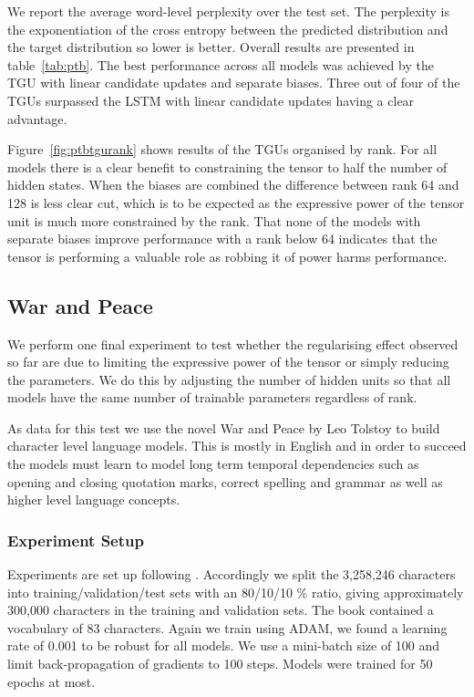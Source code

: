 We report the average word-level perplexity over the test set. The perplexity is the 
exponentiation of the cross entropy between the predicted distribution and the target distribution
so lower is better. Overall results are
presented in table~\ref{tab:ptb}. The best performance across all models was achieved by the TGU with
linear candidate updates and separate biases. Three out of four of the TGUs surpassed the LSTM with
linear candidate updates having a clear advantage.


Figure~\ref{fig:ptbtgurank} shows results of the TGUs organised by rank. For all models there
is a clear benefit to constraining the tensor to half the number of hidden states. When the biases
are combined the difference between rank 64 and 128 is less clear cut, which is to be expected as
the expressive power of the tensor unit is much more constrained by the rank. That none of the models
with separate biases improve performance with a rank below 64 indicates that the tensor is performing
a valuable role as robbing it of power harms performance.


\subsection{War and Peace}
We perform one final experiment to test whether the regularising effect
observed so far are due to limiting the expressive power of the tensor
or simply reducing the parameters. We do this by adjusting the number of hidden units so that
all models have the same number of trainable parameters regardless of rank.

As data for this test we use the novel War and Peace by Leo Tolstoy to build character level language
models. This is mostly in English and in order to succeed the models must learn to model long term
temporal dependencies such as opening and closing quotation marks, correct spelling and grammar
as well as higher level language concepts.

\subsubsection{Experiment Setup}
Experiments are set up following \autocite{Karpathy2016}. Accordingly we split the 3,258,246
characters into training/validation/test sets with an 80/10/10 \% ratio, giving approximately
300,000 characters in the training and validation sets. The book contained a vocabulary of 83 characters.
Again we train using ADAM, we found a learning rate of 0.001 to be robust for all models. We use a
mini-batch size of 100 and limit back-propagation of gradients to 100 steps. Models were trained for
50 epochs at most.

